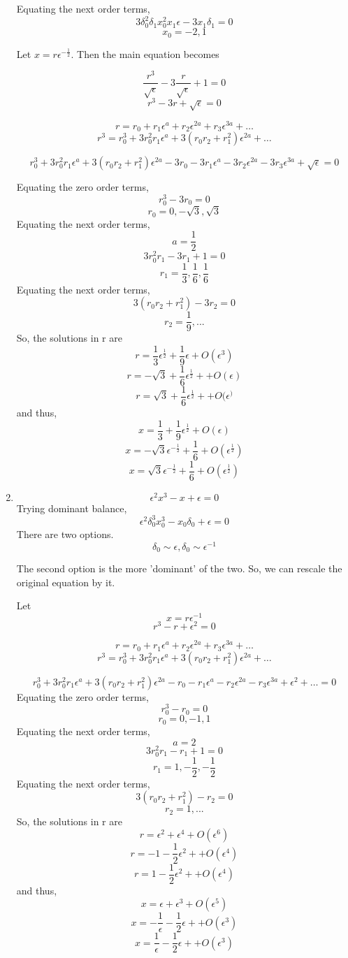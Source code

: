 \documentclass[letterpaper,12pt]{article}
\begin{document}
\begin{enumerate}
Equating the next  order terms,
\[3 \delta_0^2 \delta_1 x_0^2 x_1 \epsilon - 3x_1 \delta_1 =0\]
\[x_0 = -2,1\]

Let $x = r \epsilon^{-\frac{1}{2}}$. Then the main equation becomes

\[\frac{r^3}{\sqrt{\epsilon}}- 3\frac{r}{\sqrt{\epsilon}}+1=0\]
\[r^3-3r+\sqrt{\epsilon}=0\]

\[r = r_0 + r_1\epsilon^{a}+ r_2\epsilon^{2a} + r_3\epsilon^{3a} +\hdots\]
\[r^3 = r_0^3 + 3 r_0^2 r_1\epsilon^{a}+ 3(r_0r_2+r_1^2)\epsilon^{2a}  +\hdots\]

\[r_0^3 + 3 r_0^2 r_1\epsilon^{a}+ 3(r_0r_2+r_1^2)\epsilon^{2a} -3 r_0 -3 r_1\epsilon^{a}-3 r_2\epsilon^{2a} -3 r_3\epsilon^{3a} + \sqrt{\epsilon}=0\]

Equating the zero order terms,
\[r_0^3-3r_0=0\]
\[r_0 = 0,-\sqrt{3},\sqrt{3}\]
Equating the next order terms,
\[a = \frac{1}{2}\]
\[3 r_0^2 r_1 -3 r_1 + 1=0\]
\[r_1 = \frac{1}{3},\frac{1}{6},\frac{1}{6}\]
Equating the next order terms,
\[3(r_0r_2+r_1^2)-3r_2=0\]
\[r_2 = \frac{1}{9},...\]
So, the solutions in r  are
\[r =   \frac{1}{3}\epsilon^{\frac{1}{2}}+ \frac{1}{9}\epsilon  +O(\epsilon^3)\]
\[r = -\sqrt{3} + \frac{1}{6}\epsilon^{\frac{1}{2}}+  +O(\epsilon)\]
\[r = \sqrt{3} +  \frac{1}{6}\epsilon^{\frac{1}{2}}+ +O(\epsilon^)\]
and thus,
\[x =   \frac{1}{3}+ \frac{1}{9}\epsilon^{\frac{1}{2}} +O(\epsilon)\]
\[x = -\sqrt{3}\epsilon^{-\frac{1}{2}} + \frac{1}{6}  +O(\epsilon^{\frac{1}{2}})\]
\[x = \sqrt{3}\epsilon^{-\frac{1}{2}} +  \frac{1}{6} +O(\epsilon^{\frac{1}{2}})\]
\item
\[\epsilon^2x^3-x+\epsilon=0\]
Trying dominant balance,
\[\epsilon^2\delta_0^3x_0^3-x_0\delta_0+\epsilon=0\]
There are two options.
\[\delta_0 \sim \epsilon, \delta_0 \sim \epsilon^{-1}\]

The second option is the more 'dominant' of the two. So, we can rescale the original equation by it.

 Let
 \[x = r\epsilon^{-1}\]
 \[r^3-r+\epsilon^2=0\]

 \[r = r_0 + r_1\epsilon^{a}+ r_2\epsilon^{2a} + r_3\epsilon^{3a} +\hdots\]
 \[r^3 = r_0^3 + 3r_0^2 r_1\epsilon^{a}+ 3(r_0r_2+r_1^2)\epsilon^{2a}  +\hdots\]

\[ r_0^3 + 3r_0^2 r_1\epsilon^{a}+ 3(r_0r_2+r_1^2)\epsilon^{2a}- r_0 - r_1\epsilon^{a}- r_2\epsilon^{2a} - r_3\epsilon^{3a} +\epsilon^2 +\hdots= 0\]
Equating the zero order terms,
\[r_0^3-r_0=0\]
\[r_0 = 0,-1,1\]
Equating the next order terms,
\[a = 2\]
\[3 r_0^2 r_1 - r_1 + 1=0\]
\[r_1 = 1,-\frac{1}{2},-\frac{1}{2}\]
Equating the next order terms,
\[3(r_0r_2+r_1^2)-r_2=0\]
\[r_2 = 1,...\]
So, the solutions in r  are
\[r =  \epsilon^{2}+ \epsilon^4  +O(\epsilon^6)\]
\[r = -1- \frac{1}{2}\epsilon^{2}+  +O(\epsilon^4)\]
\[r = 1 -  \frac{1}{2}\epsilon^{2}+ +O(\epsilon^4)\]
and thus,
\[x =   \epsilon+ \epsilon^3  +O(\epsilon^5)\]
\[x = -\frac{1}{\epsilon}- \frac{1}{2}\epsilon+  +O(\epsilon^3)\]
\[x = \frac{1}{\epsilon}- \frac{1}{2}\epsilon+  +O(\epsilon^3)\]


\end{enumerate}
\end{document}
